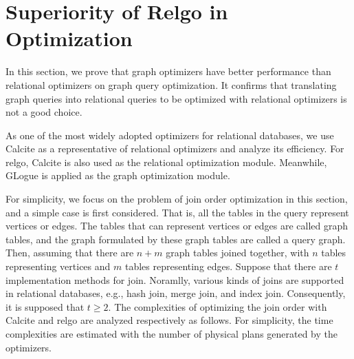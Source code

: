 \section{Superiority of Relgo in Optimization}
\label{sec:theoretical-analysis}

In this section, we prove that graph optimizers have better performance than relational optimizers on graph query optimization.
It confirms that translating graph queries into relational queries to be optimized with relational optimizers is not a good choice.

As one of the most widely adopted optimizers for relational databases, we use Calcite \cite{calcite,columbia} as a representative of relational optimizers and analyze its efficiency.
For relgo, Calcite is also used as the relational optimization module.
Meanwhile, GLogue \cite{GLogS} is applied as the graph optimization module.

For simplicity, we focus on the problem of join order optimization in this section, and a simple case is first considered.
That is, all the tables in the query represent vertices or edges.
The tables that can represent vertices or edges are called graph tables, and the graph formulated by these graph tables are called a query graph.
Then, assuming that there are $n + m$ graph tables joined together, with $n$ tables representing vertices and $m$ tables representing edges.
Suppose that there are $t$ implementation methods for join.
Noramlly, various kinds of joins are supported in relational databases, e.g., hash join, merge join, and index join.
Consequently, it is supposed that $t \geq 2$.
The complexities of optimizing the join order with Calcite and relgo are analyzed respectively as follows.
For simplicity, the time complexities are estimated with the number of physical plans generated by the optimizers.


